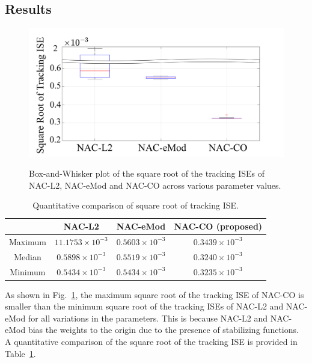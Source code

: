 \documentclass[letterpaper, 10 pt, conference]{ieeeconf}  %
\begin{document}
\subsection{Results}

\begin{figure}[!t]      
    \centering
    {\includegraphics[width=.85\linewidth]{fig/BoxWhisker.drawio.png}}
\caption{Box-and-Whisker plot of the square root of the tracking ISEs of NAC-L2, NAC-eMod and NAC-CO across various parameter values.}
    \label{fig: Box-beard plot}
\end{figure}

\begin{table}[!t]
    \renewcommand{\arraystretch}{1.3}
    \caption{Quantitative comparison of square root of tracking ISE.}
    \centering
    \begin{tabular}{c c c c }
    \hline
     & \textbf{NAC-L2}\!&\!\textbf{NAC-eMod}\!&\!\textbf{NAC-CO} (proposed) 
     \\
     \hline
    \hline 
    Maximum\!&\!$11.1753\!\times\!10^{-3}$\!&\!$0.5603\!\times\!10^{-3}$\!&\!$0.3439\!\times\!10^{-3}$\!\\
    \hline
    Median\!&\!$0.5898\!\times\!10^{-3}$\!&\!$0.5519\!\times\!10^{-3}$\!&\!$0.3240\!\times\!10^{-3}$\!\\
    \hline
    Minimum\!&\!$0.5434\!\times\!10^{-3}$\!&\!$0.5434\!\times\!10^{-3}$\!&\!$0.3235\!\times\!10^{-3}$\!\\
    \hline
    \end{tabular}
    \label{table: error norm}
\end{table}

As shown in Fig.~\ref{fig: Box-beard plot}, the maximum square root of the tracking ISE of NAC-CO is smaller than the minimum square root of the tracking ISEs of NAC-L2 and NAC-eMod for all variations in the parameters.
This is because NAC-L2 and NAC-eMod bias the weights to the origin due to the presence of stabilizing functions.
A quantitative comparison of the square root of the tracking ISE is provided in Table~\ref{table: error norm}.
\end{document}
